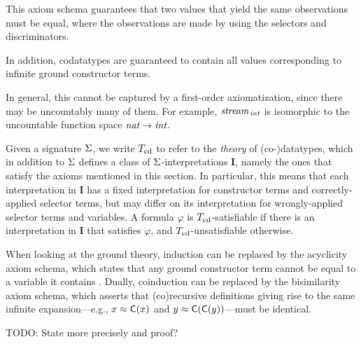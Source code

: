 This axiom schema guarantees that two values that yield the same
observations must be equal, where the observations are made by using the
selectors and discriminators.
%
\begin{report}\par\end{report}
In addition, codatatypes are guaranteed to contain all values corresponding to
infinite ground constructor terms.
\begin{report}
In general, this cannot be captured by a
first-order axiomatization, since there may be uncountably many of them.
For example, $\textit{stream}_{\,\textit{int}}$ is isomorphic to the uncountable
function space $\textit{nat} \to \textit{int}$.
\end{report}


Given a signature $\mathrm{\Sigma}$, we write $T_{\mathrm{cd}}$ to refer to the \emph{theory} of (co-)datatypes,
which in addition to $\mathrm{\Sigma}$ defines a class of $\mathrm{\Sigma}$-interpretations $\mathbf{I}$,
namely the ones that satisfy the axioms mentioned in this section.
In particular, this means that each interpretation in $\mathbf{I}$ has a fixed interpretation
for constructor terms and correctly-applied selector terms, but may differ on its interpretation for 
wrongly-applied selector terms and variables.
A formula $\varphi$ is $T_{\mathrm{cd}}$-satisfiable if there is an interpretation in $\mathbf{I}$ that satisfies $\varphi$,
and $T_{\mathrm{cd}}$-unsatisfiable otherwise.

When looking at the ground theory, induction can be replaced by the acyclicity
axiom schema, which states that any ground constructor term cannot be equal to
a variable it contains \cite{xxx}. Dually, coinduction can be replaced by the
bisimilarity axiom schema, which asserts that (co)recursive definitions giving
rise to the same infinite expansion---e.g., $x \approx \textsf{C}(x)$ and $y \approx
\textsf{C}(\textsf{C}(y))$---must be identical.

\begin{report}
TODO: State more precisely and proof?
\end{report}


